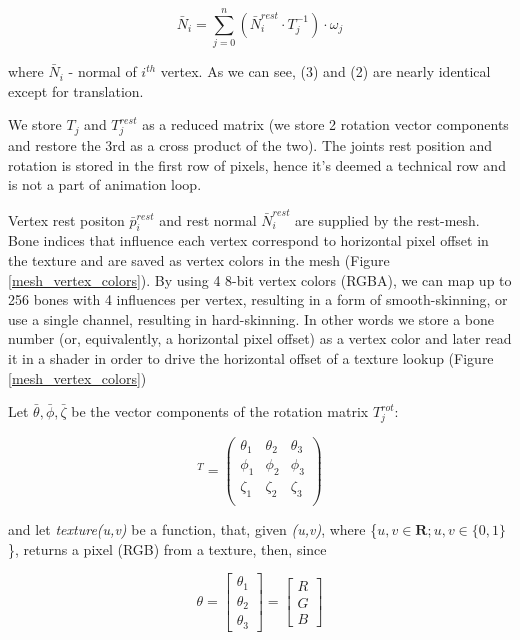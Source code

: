 \documentclass{acmsiggraph}
\begin{document}
\begin{equation}
  \bar{N}_i = \sum^n_{j=0} ( \bar{N}^{rest}_i \cdot T^{-1}_j) \cdot \omega_j
\end{equation}

where $\bar{N}_i$ - normal of $i^{th}$ vertex. As we can see, (3) and (2) are nearly identical except for translation.

We store $T_j$ and $T^{rest}_j$ as a reduced matrix (we store 2 rotation vector components and restore the 3rd as a cross product of the two).  The joints rest position and rotation is stored in the first row of pixels, hence it's deemed a technical row and is not a part of animation loop. %

Vertex rest positon $\bar{p}^{rest}_i$ and rest normal $\bar{N}^{rest}_i$ are supplied by the rest-mesh.  Bone indices that influence each vertex correspond to horizontal pixel offset in the texture and are saved as vertex colors in the mesh (Figure \ref{mesh_vertex_colors}).  By using 4 8-bit vertex colors (RGBA), we can map up to 256 bones with 4 influences per vertex, resulting in a form of smooth-skinning, or use a single channel, resulting in hard-skinning.  In other words we store a bone number (or, equivalently, a horizontal pixel offset) as a vertex color and later read it in a shader in order to drive the horizontal offset of a texture lookup (Figure \ref{mesh_vertex_colors})

Let $\bar\theta, \bar\phi, \bar\zeta$ be the vector components of the rotation matrix $T^{rot}_j$:

\begin{equation} 
  [T^{rot}_j]^{T} =
  \begin{pmatrix}
    \theta_1 & \theta_2 & \theta_3 \\
    \phi_1   & \phi_2   & \phi_3 \\
    \zeta_1  & \zeta_2  & \zeta_3 \\
  \end{pmatrix}
\end{equation}

and let \textit{texture(u,v)} be a function, that, given \textit{(u,v)}, where \{$ u,v \in \textbf{R}; u,v \in \{0,1\}$\}, returns a pixel (RGB) from a texture, then, since

\begin{equation} 
  \theta =
  \begin{bmatrix}
    \theta_1 \\
    \theta_2 \\
    \theta_3
  \end{bmatrix}
  =
  \begin{bmatrix}
    R \\
    G \\
    B
  \end{bmatrix}
\end{equation}
\end{document}
